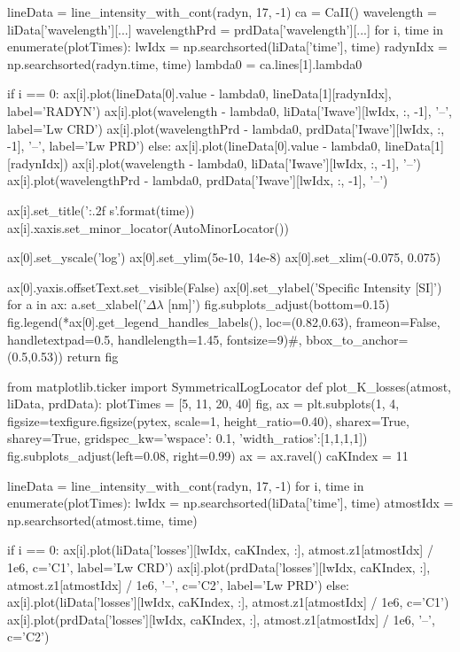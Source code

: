 \begin{pycode}[TimeDepRT]
    lineData = line_intensity_with_cont(radyn, 17, -1)
    ca = CaII()
    wavelength = liData['wavelength'][...]
    wavelengthPrd = prdData['wavelength'][...]
    for i, time in enumerate(plotTimes):
        lwIdx = np.searchsorted(liData['time'], time)
        radynIdx = np.searchsorted(radyn.time, time)
        lambda0 = ca.lines[1].lambda0

        if i == 0:
            ax[i].plot(lineData[0].value - lambda0, lineData[1][radynIdx], label='RADYN')
            ax[i].plot(wavelength - lambda0, liData['Iwave'][lwIdx, :, -1], '--', label='Lw CRD')
            ax[i].plot(wavelengthPrd - lambda0, prdData['Iwave'][lwIdx, :, -1], '--', label='Lw PRD')
        else:
            ax[i].plot(lineData[0].value - lambda0, lineData[1][radynIdx])
            ax[i].plot(wavelength - lambda0, liData['Iwave'][lwIdx, :, -1], '--')
            ax[i].plot(wavelengthPrd - lambda0, prdData['Iwave'][lwIdx, :, -1], '--')

        ax[i].set_title('{:.2f} s'.format(time))
        ax[i].xaxis.set_minor_locator(AutoMinorLocator())

    ax[0].set_yscale('log')
    ax[0].set_ylim(5e-10, 14e-8)
    ax[0].set_xlim(-0.075, 0.075)

    ax[0].yaxis.offsetText.set_visible(False)
    ax[0].set_ylabel('Specific Intensity [SI]')
    for a in ax:
        a.set_xlabel('$\Delta\lambda$ [nm]')
    fig.subplots_adjust(bottom=0.15)
    fig.legend(*ax[0].get_legend_handles_labels(), loc=(0.82,0.63), frameon=False,
               handletextpad=0.5, handlelength=1.45, fontsize=9)#, bbox_to_anchor=(0.5,0.53))
    return fig

from matplotlib.ticker import SymmetricalLogLocator
def plot_K_losses(atmost, liData, prdData):
    plotTimes = [5, 11, 20, 40]
    fig, ax = plt.subplots(1, 4, figsize=texfigure.figsize(pytex, scale=1, height_ratio=0.40),
                           sharex=True, sharey=True,
                           gridspec_kw={'wspace': 0.1, 'width_ratios':[1,1,1,1]})
    fig.subplots_adjust(left=0.08, right=0.99)
    ax = ax.ravel()
    caKIndex = 11

    lineData = line_intensity_with_cont(radyn, 17, -1)
    for i, time in enumerate(plotTimes):
        lwIdx = np.searchsorted(liData['time'], time)
        atmostIdx = np.searchsorted(atmost.time, time)

        if i == 0:
            ax[i].plot(liData['losses'][lwIdx, caKIndex, :],
                       atmost.z1[atmostIdx] / 1e6, c='C1', label='Lw CRD')
            ax[i].plot(prdData['losses'][lwIdx, caKIndex, :],
                       atmost.z1[atmostIdx] / 1e6, '--', c='C2', label='Lw PRD')
        else:
            ax[i].plot(liData['losses'][lwIdx, caKIndex, :],
                       atmost.z1[atmostIdx] / 1e6, c='C1')
            ax[i].plot(prdData['losses'][lwIdx, caKIndex, :],
                       atmost.z1[atmostIdx] / 1e6, '--', c='C2')


\end{pycode}
